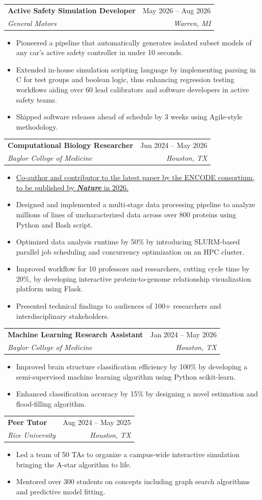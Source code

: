 \documentclass[letterpaper,11pt]{article}
\makeatletter
\newcommand{\resumeItem}[1]{
  \item\small{
    {#1 \vspace{-2pt}}
  }
}
\newcommand{\resumeSubheading}[4]{
  \vspace{-1pt}\item
    \begin{tabular*}{0.993\textwidth}[t]{l@{\extracolsep{\fill}}r}
      \textbf{#1} & #2 \\
      \textit{\small#3} & \textit{\small #4} \\
    \end{tabular*}\vspace{-7pt}
}
\newcommand{\resumeItemListStart}{\begin{itemize}[leftmargin=0.2in, itemsep=2pt]}
\newcommand{\resumeItemListEnd}{\end{itemize}\vspace{-7pt}}
\makeatother
\begin{document}
    \resumeSubheading
      {Active Safety Simulation Developer}{May 2026 -- Aug 2026}
      {General Motors}{Warren, MI}
      \resumeItemListStart
        \resumeItem{Pioneered a pipeline that automatically generates isolated subset models of any car's active safety controller in under 10 seconds.}
        \resumeItem{Extended in-house simulation scripting language by implementing parsing in C for test groups and boolean logic, thus enhancing regression testing workflows aiding over 60 lead calibrators and software developers in active safety teams.}
        \resumeItem{Shipped software releases ahead of schedule by 3 weeks using Agile-style methodology.}
      \resumeItemListEnd

    \resumeSubheading
      {Computational Biology Researcher}{Jun 2024 -- May 2026}
      {Baylor College of Medicine}{Houston, TX}
      \resumeItemListStart
        \resumeItem{\href{https://www.biorxiv.org/content/10.64898/2026.07.06.731365v1.full}{Co-author and contributor to the latest paper by the ENCODE consortium, to be published by \textbf{\textit{Nature}} in 2026.}}
        \resumeItem{Designed and implemented a multi-stage data processing pipeline to analyze millions of lines of uncharacterized data across over 800 proteins using Python and Bash script.}
        \resumeItem{Optimized data analysis runtime by 50\% by introducing SLURM-based parallel job scheduling and concurrency optimization on an HPC cluster.}
        \resumeItem{Improved workflow for 10 professors and researchers, cutting cycle time by 20\%, by developing interactive protein-to-genome relationship visualization platform using Flask.}
        \resumeItem{Presented technical findings to audiences of 100+ researchers and interdisciplinary stakeholders.}
      \resumeItemListEnd

    \resumeSubheading
      {Machine Learning Research Assistant}{Jan 2024 -- May 2026}
      {Baylor College of Medicine}{Houston, TX}
      \resumeItemListStart
        \resumeItem{Improved brain structure classification efficiency by 100\% by developing a semi-supervised machine learning algorithm using Python scikit-learn.}
        \resumeItem{Enhanced classification accuracy by 15\% by designing a novel estimation and flood-filling algorithm.}
      \resumeItemListEnd

    \resumeSubheading
      {Peer Tutor}{Aug 2024 -- May 2025}
      {Rice University}{Houston, TX}
      \resumeItemListStart
        \resumeItem{Led a team of 50 TAs to organize a campus-wide interactive simulation bringing the A-star algorithm to life.}
        \resumeItem{Mentored over 300 students on concepts including graph search algorithms and predictive model fitting.}
      \resumeItemListEnd
\end{document}
